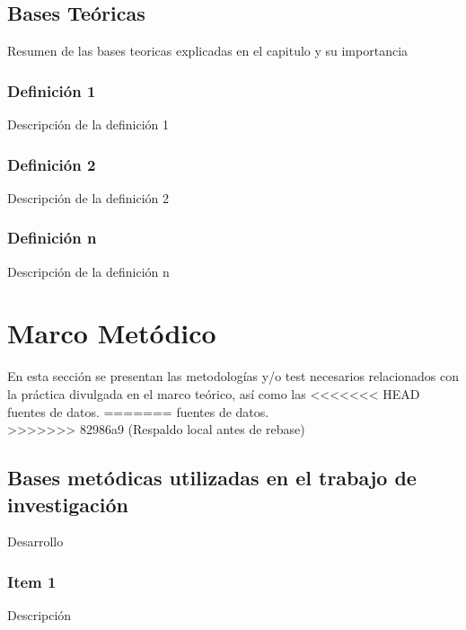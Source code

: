 \documentclass[oneside,11pt]{Latex/Classes/PhDthesisPSnPDF}
\begin{document}
\begin{table}[ht]
\section{Bases Teóricas}

Resumen de las bases teoricas explicadas en el capitulo y su
importancia\\

\subsection{Definición 1}

Descripción de la definición 1\\

\subsection{Definición 2}

Descripción de la definición 2\\

\subsection{Definición n}

Descripción de la definición n\\

\chapter{Marco Metódico}

En esta sección se presentan las metodologías y/o test necesarios
relacionados con la práctica divulgada en el marco teórico, así como las
<<<<<<< HEAD
fuentes de datos.
=======
fuentes de datos.\\
>>>>>>> 82986a9 (Respaldo local antes de rebase)

\section{Bases metódicas utilizadas en el trabajo de investigación}

Desarrollo\\

\subsection{Item 1}

Descripción\\


\end{table}
\end{document}
